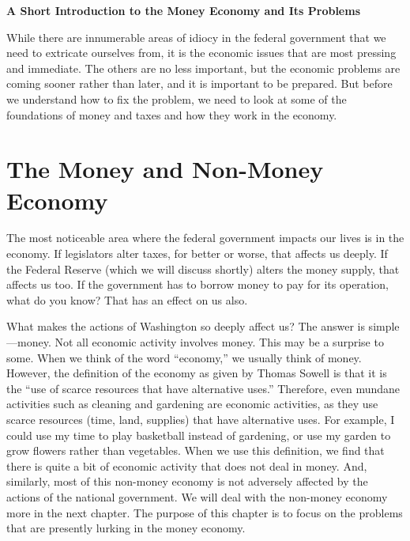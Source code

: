 \documentclass[letterpaper]{article}
\title{}
\begin{document}
\clearpage\setcounter{page}{1}\pagestyle{Standard}
{\centering{}\bfseries\color{black}
A Short Introduction to the Money Economy and Its Problems
\par}

{\color{black}
While there are innumerable areas of idiocy in the federal government
that we need to extricate ourselves from, it is the economic issues
that are most pressing
and\textcolor[rgb]{0.32941177,0.5529412,0.83137256}{ immediate}. The
others are no less important, but the economic problems are coming
sooner rather than later, and it is important to be prepared.  But
before we understand how to fix the problem, we need to look at some of
the foundations of money and taxes and how they work in the economy.}

\section{The Money and Non-Money Economy}
{\color{black}
The most noticeable area where the federal government impacts our lives
is in the economy. If legislators alter taxes, for better or worse,
that affects us deeply. If the Federal Reserve (which we will discuss
shortly) alters the money supply, that affects us too. If the
government has to borrow money to pay for its operation,
\textcolor[rgb]{0.32941177,0.5529412,0.83137256}{what do you know? That
has an effect on us also.}}

{\color{black}
What makes the actions of Washington so deeply affect us?  The answer is
simple—money.  Not all economic activity involves money. This may be a
surprise to some. When we think of the word “economy,” we usually think
of money. However, the definition of the economy as given by Thomas
Sowell is that it is the “use of scarce resources that have alternative
uses.”  Therefore, even mundane activities such as cleaning and
gardening are economic
activities\textcolor[rgb]{0.32941177,0.5529412,0.83137256}{, as} they
use scarce resources (time, land, supplies) that have alternative uses.
\textcolor[rgb]{0.32941177,0.5529412,0.83137256}{For example, }I could
use my time to play basketball instead of gardening, or use my garden
to grow flowers rather than vegetables. When we use this definition, we
find that there is quite a bit of economic activity that does not deal
in money. And, similarly, most of this non-money economy is not
adversely affected by the actions of the national government. We will
deal with the non-money economy more in the next chapter. The purpose
of this chapter is to focus on the problems that are presently lurking
in the money economy.}
\end{document}
